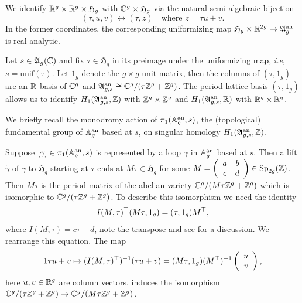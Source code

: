 \documentclass[12pt,oneside]{amsart}
\begin{document}
We identify ${\mathbb{R}}^g\times{\mathbb{R}}^g\times \mathfrak{H}_g$
 with
${\mathbb{C}}^g\times \mathfrak{H}_g$ via the natural semi-algebraic bijection
\begin{equation}
  \label{eq:complexstructure}
(\tau,u,v)  \leftrightarrow
(\tau,z)\quad\text{where $z = \tau u + v$.}
\end{equation}
In the former coordinates, the
corresponding uniformizing map $\mathfrak{H}_g
\times{\mathbb{R}}^{2g}\rightarrow\mathfrak{A}_g^{\mathrm{an}}$ is real
analytic.

Let $s\in \mathfrak{A}_g({\mathbb{C}})$ and fix 
$\tau\in\mathfrak{H}_g$ in its preimage under the uniformizing map, \textit{i.e}, $s =
\mathrm{unif}(\tau)$. Let $1_g$ denote the $g\times g$ unit matrix,
then the columns of $(\tau,1_g)$ are an ${\mathbb{R}}$-basis of ${\mathbb{C}}^g$ and
$\mathfrak{A}_{g,s}^{\mathrm{an}} \cong {\mathbb{C}}^g/(\tau{\mathbb{Z}}^g +
{\mathbb{Z}}^g)$.
The period lattice basis $(\tau,1_g)$ allows us to identify
$H_1(\mathfrak{A}_{g,s}^{\mathrm{an}},{\mathbb{Z}})$ with ${\mathbb{Z}}^{g}\times{\mathbb{Z}}^g$
and $H_1(\mathfrak{A}_{g,s}^{\mathrm{an}},{\mathbb{R}})$ with
${\mathbb{R}}^g\times{\mathbb{R}}^g$.

We briefly recall the monodromy action of
$\pi_1({\mathbb{A}}_g^{\mathrm{an}},s)$, the (topological) fundamental group of
${\mathbb{A}}_g^{\mathrm{an}}$ based at $s$, on singular homology
$H_1(\mathfrak{A}_{g,s}^{\mathrm{an}},{\mathbb{Z}})$.

Suppose $[\gamma] \in \pi_1({\mathbb{A}}_g^{\mathrm{an}},s)$ is represented by
a loop $\gamma$ in ${\mathbb{A}}_{g}^{\mathrm{an}}$ based at $s$. Then a lift
$\tilde\gamma$ of $\gamma$ to $\mathfrak{H}_g$ starting at $\tau$ ends
at $M \tau\in \mathfrak{H}_g$ for some $M=\left(
  \begin{array}{cc} a&b \\c & d
  \end{array}\right)\in \mathrm{Sp}_{2g}({\mathbb{Z}})$. Then $M\tau$ is the
period matrix of the abelian variety ${\mathbb{C}}^g/(M\tau{\mathbb{Z}}^g+{\mathbb{Z}}^g)$ which
is isomorphic to ${\mathbb{C}}^g / (\tau{\mathbb{Z}}^g+{\mathbb{Z}}^g)$. To describe this
isomorphism we need the identity
\begin{equation}
  \label{eq:analyticiso}
  I(M,\tau)^\top (M\tau,1_g) = (\tau,1_g) M^\top,  
\end{equation}
where $I(M,\tau)=c\tau+d$, note the transpose and
see \cite[$\mathsection$8.1 and Remark~8.1.4]{CAV}
for a discussion. We rearrange this equation.
The map
\begin{alignat}1
  \label{eq:monodromyiso}
\tau u + v\mapsto (I(M,\tau)^\trans)^{-1}(\tau u+v)=
(M\tau,1_g)(M^\trans)^{-1}
\left(
  \begin{array}{c}
    u \\ v
  \end{array}
\right),
\end{alignat}
here $u,v\in{\mathbb{R}}^g$ are column vectors, induces the isomorphism ${\mathbb{C}}^g /
(\tau{\mathbb{Z}}^g+{\mathbb{Z}}^g)\rightarrow{\mathbb{C}}^g/(M\tau{\mathbb{Z}}^g+{\mathbb{Z}}^g)$.
\end{document}
